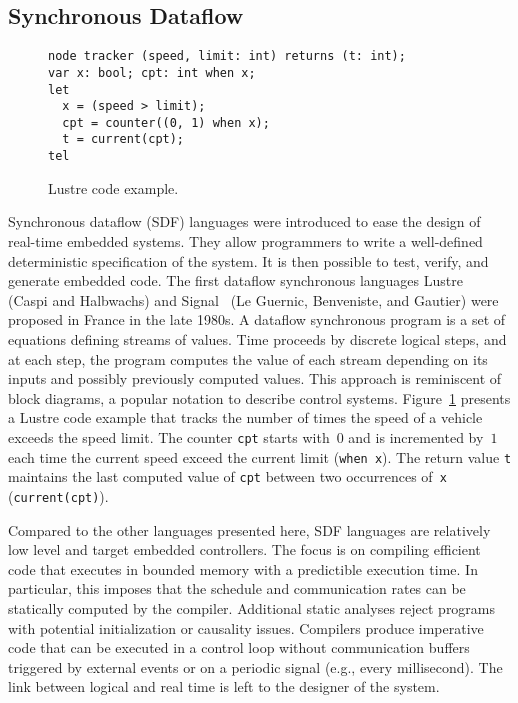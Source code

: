 \subsection{Synchronous Dataflow}\label{sec:sdf} %

\begin{figure}[!h]
\begin{lstlisting}[morekeywords={node,int,bool,returns,var,when,let,tel,current}]
node tracker (speed, limit: int) returns (t: int);
var x: bool; cpt: int when x;
let
  x = (speed > limit);
  cpt = counter((0, 1) when x);
  t = current(cpt);
tel
\end{lstlisting}
\vspace*{-4mm}
\caption{\label{fig:lustre} Lustre code example.}
\end{figure}

Synchronous dataflow (SDF) languages were introduced to ease the design of
real-time embedded systems. They allow programmers to write a well-defined
deterministic specification of the system. It is then possible to
test, verify, and generate embedded code.
The first data\-flow synchronous languages \textsf{Lustre}~\cite{lustre_1987}
(Caspi and Halbwachs) and \textsf{Signal}~\cite{signal_1991} (Le Guernic,
Benveniste, and Gautier) were proposed in France in the late 1980s.
A dataflow synchronous program is a set of equations defining streams
of values. Time proceeds by discrete logical steps, and at each step,
the program computes the value of each stream depending on its inputs
and possibly previously computed values.
This approach is reminiscent of block diagrams, a popular notation to
describe control systems.
Figure~\ref{fig:lustre} presents a Lustre code example that tracks the
number of times the speed of a vehicle exceeds the speed limit. The
counter \lstinline{cpt} starts with~$0$ and is incremented by~$1$ each
time the current speed exceed the current limit (\lstinline{when x}).
The return value \lstinline{t} maintains the last computed value
of \lstinline{cpt} between two occurrences of~\lstinline{x}
(\lstinline{current(cpt)}).

Compared to the other languages presented here, SDF languages are
relatively low level and target embedded controllers. The focus is on
compiling efficient code that executes in bounded memory with a
predictible execution time.  In particular, this imposes that the
schedule and communication rates can be statically computed by the
compiler. Additional static analyses reject programs with potential
initialization or causality issues. Compilers produce imperative code
that can be executed in a control loop without communication buffers
triggered by external events or on a periodic signal (e.g., every
millisecond). The link between logical and real time is left to the
designer of the system.

